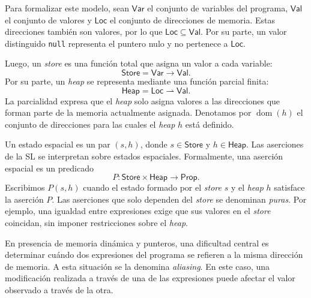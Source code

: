 \documentclass[a4paper,	11pt]{report}
\begin{document}
Para formalizar este modelo,
sean $\mathsf{Var}$ el conjunto de variables del programa,
$\mathsf{Val}$ el conjunto de valores y $\mathsf{Loc}$ el conjunto de direcciones de memoria.
Estas direcciones también son valores,
por lo que $\mathsf{Loc} \subseteq \mathsf{Val}$.
Por su parte,
un valor distinguido \texttt{null} representa el puntero nulo y no pertenece a $\mathsf{Loc}$.

Luego,
un \emph{store} es una función total que asigna un valor a cada variable:
$$\mathsf{Store} = \mathsf{Var} \rightarrow \mathsf{Val}.$$
Por su parte, un \emph{heap} se representa mediante una función parcial finita:
$$\mathsf{Heap} = \mathsf{Loc} \rightharpoonup \mathsf{Val}.$$
La parcialidad expresa que el \emph{heap} solo asigna valores a las direcciones
que forman parte de la memoria actualmente asignada.
Denotamos por $\operatorname{dom}(h)$ el conjunto de direcciones para las cuales el \emph{heap} $h$ está definido.

Un estado espacial es un par $(s, h)$,
donde $s \in \mathsf{Store}$ y $h \in \mathsf{Heap}$.
Las aserciones de la SL se interpretan sobre estados espaciales.
Formalmente, una aserción espacial es un predicado
$$P : \mathsf{Store} \times \mathsf{Heap} \rightarrow \mathsf{Prop}.$$
Escribimos $P(s, h)$
cuando el estado formado por el \emph{store} $s$ y el \emph{heap} $h$ satisface la aserción $P$.
Las aserciones que solo dependen del \emph{store} se denominan \emph{puras}.
Por ejemplo,
una igualdad entre expresiones exige que sus valores en el \emph{store} coincidan,
sin imponer restricciones sobre el \emph{heap}.

En presencia de memoria dinámica y punteros,
una dificultad central es determinar cuándo dos expresiones del programa
se refieren a la misma dirección de memoria.
A esta situación se la denomina \emph{aliasing}.
En este caso,
una modificación realizada a través de una de las expresiones puede afectar el valor observado a través de la otra.
\end{document}
